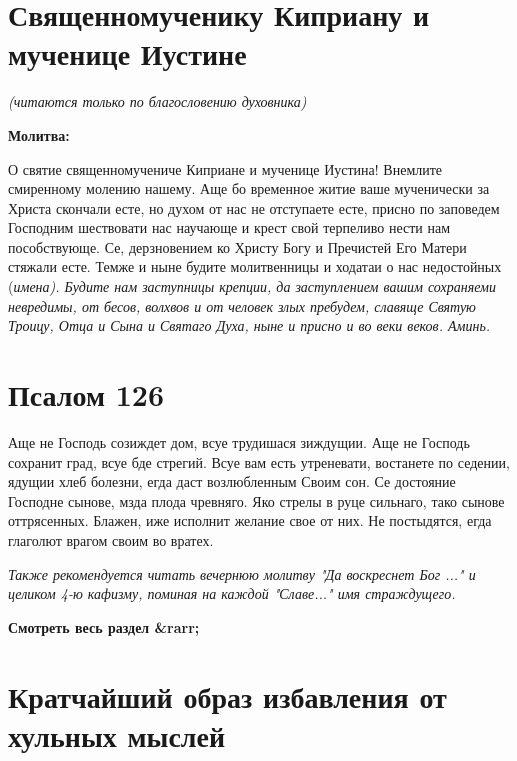 \section{Священномученику Киприану и мученице Иустине}
 


\itshape (читаются только по благословению духовника)\normalfont{}


\medskip


\bfseries Молитва:\normalfont{}


 О святие священномучениче Киприане и мученице Иустина! Внемлите смиренному молению нашему. Аще бо временное житие ваше мученически за Христа скончали есте, но духом от нас не отступаете есте, присно по заповедем Господним шествовати нас научающе и крест свой терпеливо нести нам пособствующе. Се, дерзновением ко Христу Богу и Пречистей Его Матери стяжали есте. Темже и ныне будите молитвенницы и ходатаи о нас недостойных (\itshape имена\normalfont{}). Будите нам заступницы крепции, да заступлением вашим сохраняеми невредимы, от бесов, волхвов и от человек злых пребудем, славяще Святую Троицу, Отца и Сына и Святаго Духа, ныне и присно и во веки веков. Аминь.


\section{Псалом 126}
 


Аще не Господь созиждет дом, всуе трудишася зиждущии. Аще не Господь сохранит град, всуе бде стрегий. Всуе вам есть утреневати, востанете по седении, ядущии хлеб болезни, егда даст возлюбленным Своим сон. Се достояние Господне сынове, мзда плода чревняго. Яко стрелы в руце сильнаго, тако сынове оттрясенных. Блажен, иже исполнит желание свое от них. Не постыдятся, егда глаголют врагом своим во вратех.

\itshape Также рекомендуется читать вечернюю молитву  "Да воскреснет Бог ..." и целиком 4-ю кафизму, поминая на каждой "Славе..." имя страждущего.

\normalfont{} 


\mychapterending


\bfseries Смотреть весь раздел &rarr;\normalfont{} 

\section{Кратчайший образ избавления от хульных мыслей}
 





